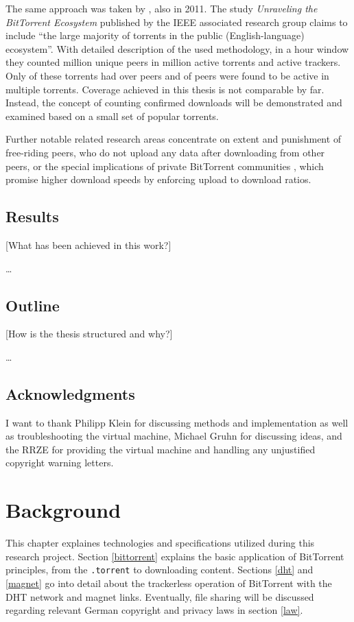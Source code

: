 \documentclass[10pt, a4paper, twoside, headsepline]{scrbook}
\renewcommand{\_}{\origunderscore\allowbreak}
\begin{document}
The same approach was taken by \textcite{zhang2011unraveling}, also in 2011. The study \emph{Unraveling the BitTorrent Ecosystem} published by the IEEE associated research group claims to include ``the large majority of torrents in the public (English-language) ecosystem''. With detailed description of the used methodology, in a  hour window they counted  million unique peers in  million active torrents and  active trackers. Only  of these torrents had over  peers and  of peers were found to be active in multiple torrents. Coverage achieved in this thesis is not comparable by far. Instead, the concept of counting confirmed downloads will be demonstrated and examined based on a small set of popular torrents.

Further notable related research areas concentrate on extent \cite{locher2006free} and punishment \cite{levin2008bittorrent, bhakuni} of free-riding peers, who do not upload any data after downloading from other peers, or the special implications of private BitTorrent communities \cite{meulpolder2010public}, which promise higher download speeds by enforcing upload to download ratios.

\section{Results}
[What has been achieved in this work?]

\dots

\section{Outline}
[How is the thesis structured and why?]

\dots

\section{Acknowledgments}
I want to thank Philipp Klein for discussing methods and implementation as well as troubleshooting the virtual machine, Michael Gruhn for discussing ideas, and the RRZE for providing the virtual machine and handling any unjustified copyright warning letters.

\chapter{Background}
This chapter explaines technologies and specifications utilized during this research project. Section \ref{bittorrent} explains the basic application of BitTorrent principles, from the \texttt{.torrent} to downloading content. Sections \ref{dht} and \ref{magnet} go into detail about the trackerless operation of BitTorrent with the DHT network and magnet links. Eventually, file sharing will be discussed regarding relevant German copyright and privacy laws in section \ref{law}.
\end{document}
